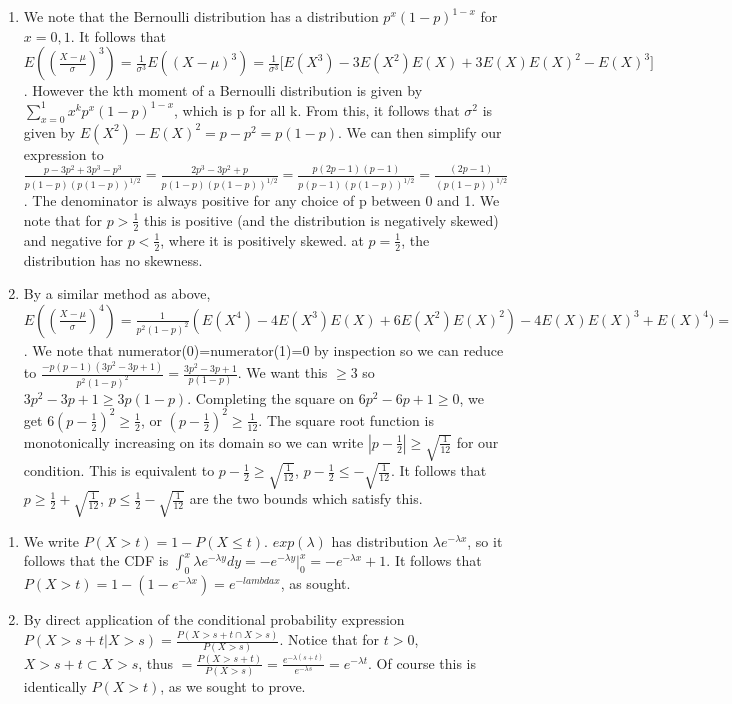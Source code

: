 \documentclass{article}
\begin{document}
\begin{prob}
	\begin{enumerate}
		\item We note that the Bernoulli distribution has a distribution $p^x(1-p)^{1-x}$ for $x=0,1$.
			It follows that $E((\frac{X-\mu}{\sigma})^3)=\frac{1}{\sigma^3}E((X-\mu)^3)=\frac{1}{\sigma^3}\big[E(X^3)-3E(X^2)E(X)+3E(X)E(X)^2-E(X)^3\big]$.
		However the kth moment of a Bernoulli distribution is given by $\sum_{x=0}^{1}x^kp^x(1-p)^{1-x}$, which is p for all k.
		From this, it follows that $\sigma^2$ is given by $E(X^2)-E(X)^2=p-p^2=p(1-p)$.
		We can then simplify our expression to $\frac{p-3p^2+3p^3-p^3}{p(1-p)(p(1-p))^{1/2}}=\frac{2p^3-3p^2+p}{p(1-p)(p(1-p))^{1/2}}=\frac{p(2p-1)(p-1)}{p(p-1)(p(1-p))^{1/2}}=\frac{(2p-1)}{(p(1-p))^{1/2}}$. The denominator is always positive for any choice of p between 0 and 1.
		We note that for $p >\frac{1}{2}$ this is positive (and the distribution is negatively skewed) and negative for $p <\frac{1}{2}$, where it is positively skewed.
		at $p=\frac{1}{2}$, the distribution has no skewness.

	\item By a similar method as above, $E((\frac{X-\mu}{\sigma})^4)= \frac{1}{p^2(1-p)^2}(E(X^4)-4E(X^3)E(X)+6E(X^2)E(X)^2)-4E(X)E(X)^3+E(X)^4)=\frac{p-4p^2+6p^3-4p^4+p^4}{(p^2(1-p)^2)}$.
		We note that numerator(0)=numerator(1)=0 by inspection so we can reduce to $\frac{-p(p-1)(3p^2-3p+1)}{p^2(1-p)^2}=\frac{3p^2-3p+1}{p(1-p)}$. We want this $\geq3$ so $3p^2-3p+1 \geq 3p(1-p)$.
	Completing the square on $6p^2-6p+1 \geq 0$, we get $6(p-\frac{1}{2})^2 \geq\frac{1}{2}$, or $(p-\frac{1}{2})^2 \geq\frac{1}{12}$.
	The square root function is monotonically increasing on its domain so we can write $|p-\frac{1}{2}| \geq\sqrt{\frac{1}{12}}$ for our condition.
	This is equivalent to $p-\frac{1}{2} \geq \sqrt{\frac{1}{12}}$, $p-\frac{1}{2} \leq -\sqrt{\frac{1}{12}}$.
	It follows that $p \geq\frac{1}{2}+ \sqrt{\frac{1}{12}}$, $p \leq\frac{1}{2}- \sqrt{\frac{1}{12}}$ are the two bounds which satisfy this.
	\end{enumerate}
\end{prob}

\begin{prob}
	\begin{enumerate}
		\item We write $P(X>t)=1-P(X \leq t)$. $exp(\lambda)$ has distribution $\lambda e^{-\lambda x}$, so it follows that the CDF is $\int^{x}_{0}\lambda e^{-\lambda y}dy=-e^{-\lambda y}\big|^{x}_{0}=-e^{-\lambda x}+1$.
		It follows that $P(X>t)=1-(1-e^{-\lambda x})= e^{-lambda x}$, as sought.

	\item By direct application of the conditional probability expression $P(X>s+t|X>s)=\frac{P(X>s+t \cap X>s)}{P(X>s)}$.
		Notice that for $t>0$, $X>s+t \subset X>s$, thus  $=\frac{P(X>s+t)}{P(X>s)}=\frac{e^{-\lambda (s+t)}}{e^{-\lambda s}}=e^{-\lambda t}$.
	Of course this is identically $P(X>t)$, as we sought to prove.
	\end{enumerate}
\end{prob}
\end{document}
